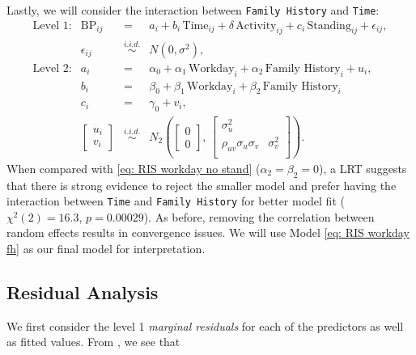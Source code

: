\documentclass[12pt,twoside,letterpaper]{article}
\theoremstyle{definition}
\theoremstyle{definition}
\begin{document}
Lastly, we will consider the interaction between \texttt{Family History} and \texttt{Time}:
\begin{equation}\label{eq: RIS workday fh}
    \begin{array}{rrcll}
        \text{Level 1}: & \text{BP}_{ij} &=& a_i + b_i\, \text{Time}_{ij} + \delta \, \text{Activity}_{ij} + c_i\, \text{Standing}_{ij} + \epsilon_{ij}, \\[0.5ex]
         & \epsilon_{ij} &\overset{i.i.d.}{\sim}& N(0, \sigma^2), \\[0.5ex]
        \text{Level 2}: & a_i &=& \alpha_0 + \alpha_1\, \text{Workday}_i + \alpha_2\, \text{Family History}_i + u_i, \\[0.5ex]
        & b_i &=& \beta_0 + \beta_1\, \text{Workday}_i+ \beta_2\, \text{Family History}_i \\[0.5ex]
        & c_i &=& \gamma_0 + v_i, \\[1ex]
         & \begin{bmatrix} u_i \\ v_i 
         \end{bmatrix} &\overset{i.i.d.}{\sim}& N_2\left(\begin{bmatrix} 0 \\ 0 \end{bmatrix},\, \begin{bmatrix} \sigma_u^2 &\\ 
         \rho_{uv}\sigma_u\sigma_v & \sigma_v^2\\
         \end{bmatrix} \right).
    \end{array}
\end{equation}
When compared with \ref{eq: RIS workday no stand} ($\alpha_2 = \beta_2 = 0$), a LRT suggests that there is strong evidence to reject the smaller model and prefer having the interaction between \texttt{Time} and \texttt{Family History} for better model fit ($\chi^2 (2) = 16.3$, $p = 0.00029$). As before, removing the correlation between random effects results in convergence issues. We will use Model \ref{eq: RIS workday fh} as our final model for interpretation.

\subsection{Residual Analysis}\label{sec: resid}

We first consider the level 1 \emph{marginal residuals} for each of the predictors as well as fitted values. From , we see that 
\end{document}

